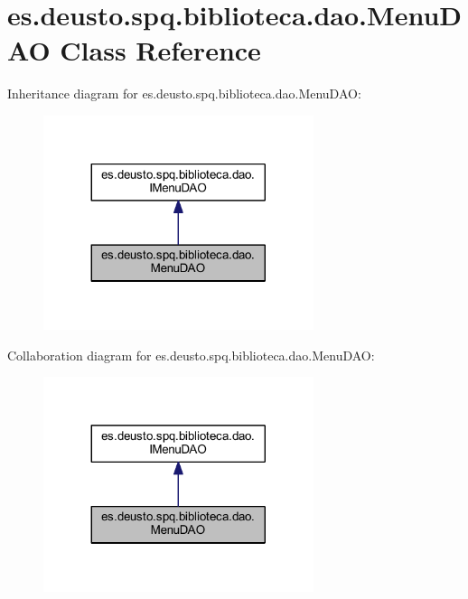 \hypertarget{classes_1_1deusto_1_1spq_1_1biblioteca_1_1dao_1_1_menu_d_a_o}{}\section{es.\+deusto.\+spq.\+biblioteca.\+dao.\+Menu\+D\+AO Class Reference}
\label{classes_1_1deusto_1_1spq_1_1biblioteca_1_1dao_1_1_menu_d_a_o}


Inheritance diagram for es.\+deusto.\+spq.\+biblioteca.\+dao.\+Menu\+D\+AO\+:
\nopagebreak
\begin{figure}[H]
\begin{center}
\leavevmode
\includegraphics[width=224pt]{classes_1_1deusto_1_1spq_1_1biblioteca_1_1dao_1_1_menu_d_a_o__inherit__graph}
\end{center}
\end{figure}


Collaboration diagram for es.\+deusto.\+spq.\+biblioteca.\+dao.\+Menu\+D\+AO\+:
\nopagebreak
\begin{figure}[H]
\begin{center}
\leavevmode
\includegraphics[width=224pt]{classes_1_1deusto_1_1spq_1_1biblioteca_1_1dao_1_1_menu_d_a_o__coll__graph}
\end{center}
\end{figure}
